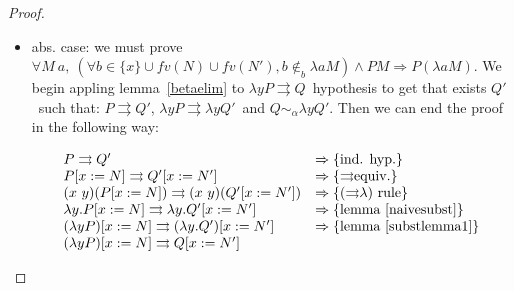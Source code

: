 \documentclass[preprint,10pt]{sigplanconf}
\newcommand{\lam}{\ensuremath{\lambda}}
\newcommand{\alpsym}{\ensuremath{\sim_\alpha}}
\newcommand{\p}{\ensuremath{\rightrightarrows}}
\newcommand{\ninb}{\ensuremath{\not\in_b}}
\begin{document}
\begin{proof}
\begin{itemize}
\begin{itemize}
\[ Q [x := N] \p Q' [x := N'] \]

So if we prove that:

\begin{equation}
  \label{eq:eq1}
P'' [x := N'] [y := Q'[x := N']] \alpsym R [x := N']  
\end{equation}


\noindent we will be able to apply the ($\p\beta$) rule and get that $(\lam y (P [x := N])) (Q [x := N]) \p R [x := N']$. Then we can pull out the substitution operation in the left side of this relation, and using the lemma~\ref{pleftalpha} we will get the desired result.

Only remains to prove~\ref{eq:eq1} to end the proof. Again, here the classic informal proofs use the BVC convention. We can mimic this common practice as our induction principle gives us a binder $y$\ distinct form $x$ and fresh in $N'$, so we can succesfully apply the substitution composition lemma~\ref{substcomp} in the following steps.
\[
\begin{array}{ll}
  P'' [x := N'] [y := Q'[x := N']] & \alpsym \{\text{lemma~\ref{substcomp}}\}\\
  P'' [y := Q'] [x := N'] & \equiv \{\text{lemma~\ref{substlemma1}}\}\\
  R [x := N']
\end{array}
\]

  \end{itemize}
\item abs. case: we must prove $\forall M\ a,\ (\forall b \in \{x \} \cup fv(N) \cup fv(N'), b \ninb \lam a M) \wedge P M   \Rightarrow P (\lam a M) $. We begin appling lemma~\ref{betaelim} to $\lam y P \p Q$\ hypothesis to get that exists $Q'$\ such that:  $P \p Q'$, $\lam y P \p \lam y Q'$\ and $Q \alpsym \lam y Q'$. Then we can end the proof in the following way:

  \[
    \begin{array}{ll}
      P \p Q'& \Rightarrow \{\text{ind. hyp.} \} \\
      P [x := N] \p Q' [x := N'] & \Rightarrow \{\text{\p equiv.} \} \\
      (x\ y)(P [x := N]) \p (x\ y)(Q' [x := N']) & \Rightarrow \{\text{(\p\lam) rule} \} \\
      \lam y . P [x := N] \p \lam y . Q' [x := N'] & \Rightarrow \{\text{lemma~\ref{naivesubst}} \} \\
      (\lam y P) [x := N] \p (\lam y . Q') [x := N'] & \Rightarrow \{\text{lemma~\ref{substlemma1}} \} \\
      (\lam y P) [x := N] \p Q [x := N'] &
    \end{array}
  \]
  \end{itemize}
\end{proof}
\end{document}
